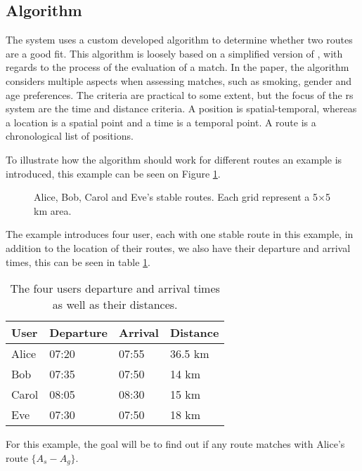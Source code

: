 \subsection{Algorithm}
The system uses a custom developed algorithm to determine whether two routes are a good fit.
This algorithm is loosely based on a simplified version of \citet{ghoseiri2011real}, with regards to the process of the evaluation of a match.
In the paper, the algorithm considers multiple aspects when assessing matches, such as smoking, gender and age preferences.
The criteria are practical to some extent, but the focus of the \gls{rs} system are the time and distance criteria.
A position is spatial-temporal, whereas a location is a spatial point and a time is a temporal point.
A route is a chronological list of positions.

To illustrate how the algorithm should work for different routes an example is introduced, this example can be seen on Figure \ref{fig:algEx1}.
\begin{figure}[!ht]
    \centering

    \caption{Alice, Bob, Carol and Eve's stable routes. Each grid represent a 5$\times$5 km area.}
    \label{fig:algEx1}
\end{figure}
The example introduces four user, each with one stable route in this example, in addition to the location of their routes, we also have their departure and arrival times, this can be seen in table \ref{timetable}.
\begin{table}[]
\centering
\begin{tabular}{@{}llll@{}}
\toprule
\textbf{User} & \textbf{Departure} & \textbf{Arrival} & \textbf{Distance} 	\\ \midrule
Alice         & 07:20                   & 07:55       & 36.5 km 			\\
Bob           & 07:35                   & 07:50       & 14 km  		  		\\
Carol         & 08:05                   & 08:30       & 15 km         		\\
Eve           & 07:30                   & 07:50       & 18 km         		\\ \bottomrule
\end{tabular}
\caption{The four users departure and arrival times as well as their distances.}
\label{timetable}
\end{table}

For this example, the goal will be to find out if any route matches with Alice's route $\{A_s-A_g\}$.

